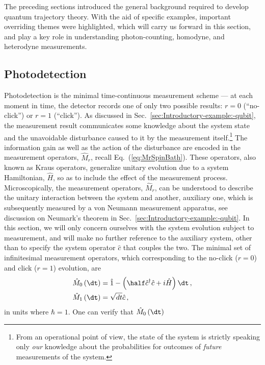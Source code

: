 The preceding sections introduced the general background required
to develop quantum trajectory theory. With the aid of specific examples,
important overriding themes were highlighted, which will carry us
forward in this section, and play a key role in understanding photon-counting,
homodyne, and heterodyne measurements. 


\subsection{Photodetection \label{subsec:Photodetection}}

Photodetection is the minimal time-continuous measurement scheme —
at each moment in time, the detector records one of only two possible
results: $r=0$ (``no-click'') or $r=1$ (``click''). As discussed
in Sec.~\ref{sec:Introductory-example:-qubit}, the measurement result
communicates some knowledge about the system state and the unavoidable
disturbance caused to it by the measurement itself.\footnote{From an operational point of view, the state of the system is strictly
speaking only \emph{our} knowledge about the probabilities for outcomes
of \emph{future} measurements of the system.} The information gain as well as the action of the disturbance are
encoded in the measurement operators, $\hat{M}_{r}$, recall Eq.~(\ref{eq:MrSpinBath}).
These operators, also known as Kraus operators, generalize unitary
evolution due to a system Hamiltonian, $\hat{H}$, so as to include
the effect of the measurement process. Microscopically, the measurement
operators, $\hat{M}_{r}$, can be understood to describe the unitary
interaction between the system and another, auxiliary one, which is
subsequently measured by a von Neumann measurement apparatus, see
discussion on Neumark's theorem in Sec.~\ref{sec:Introductory-example:-qubit}.
In this section, we will only concern ourselves with the system evolution
subject to measurement, and will make no further reference to the
auxiliary system, other than to specify the system operator $\hat{c}$
that couples the two. The minimal set of infinitesimal measurement
operators, which corresponding to the no-click ($r=0$) and click
($r=1$) evolution, are
\begin{align}
\hat{M}_{0}\left(\dt\right) & =\hat{1}-\left(\half\hat{c}^{\dagger}\hat{c}+i\hat{H}\right)\dt\,,\label{eq:photonM0}\\
\hat{M}_{1}\left(\dt\right) & =\sqrt{dt}\hat{c}\,,\label{eq:photonM1}
\end{align}
in units where $\hbar=1$. One can verify that $\hat{M}_{0}\left(\dt\right)$

